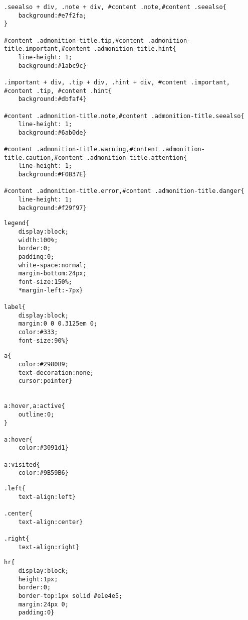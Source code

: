 \documentclass[11pt]{article}
\begin{document}
\begin{verbatim}
.seealso + div, .note + div, #content .note,#content .seealso{
    background:#e7f2fa;
}

#content .admonition-title.tip,#content .admonition-title.important,#content .admonition-title.hint{
    line-height: 1;
    background:#1abc9c}

.important + div, .tip + div, .hint + div, #content .important, #content .tip, #content .hint{
    background:#dbfaf4}

#content .admonition-title.note,#content .admonition-title.seealso{
    line-height: 1;
    background:#6ab0de}

#content .admonition-title.warning,#content .admonition-title.caution,#content .admonition-title.attention{
    line-height: 1;
    background:#F0B37E}

#content .admonition-title.error,#content .admonition-title.danger{
    line-height: 1;
    background:#f29f97}
\end{verbatim}

\begin{verbatim}
legend{
    display:block;
    width:100%;
    border:0;
    padding:0;
    white-space:normal;
    margin-bottom:24px;
    font-size:150%;
    *margin-left:-7px}

label{
    display:block;
    margin:0 0 0.3125em 0;
    color:#333;
    font-size:90%}
\end{verbatim}

\begin{verbatim}
a{
    color:#2980B9;
    text-decoration:none;
    cursor:pointer}


a:hover,a:active{
    outline:0;
}

a:hover{
    color:#3091d1}

a:visited{
    color:#9B59B6}
\end{verbatim}

\begin{verbatim}
.left{
    text-align:left}

.center{
    text-align:center}

.right{
    text-align:right}
\end{verbatim}

\begin{verbatim}
hr{
    display:block;
    height:1px;
    border:0;
    border-top:1px solid #e1e4e5;
    margin:24px 0;
    padding:0}
\end{verbatim}
\end{document}
